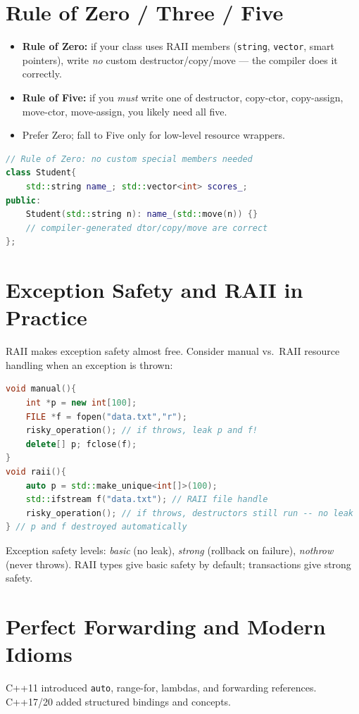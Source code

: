\section{Rule of Zero / Three / Five}
\label{sec:rule-of-five}
\begin{itemize}[leftmargin=*]
    \item \textbf{Rule of Zero:} if your class uses RAII members (\texttt{string}, \texttt{vector}, smart pointers), write \emph{no} custom destructor/copy/move --- the compiler does it correctly.
    \item \textbf{Rule of Five:} if you \emph{must} write one of destructor, copy-ctor, copy-assign, move-ctor, move-assign, you likely need all five.
    \item Prefer Zero; fall to Five only for low-level resource wrappers.
\end{itemize}
\begin{lstlisting}[language=C++]
// Rule of Zero: no custom special members needed
class Student{
    std::string name_; std::vector<int> scores_;
public:
    Student(std::string n): name_(std::move(n)) {}
    // compiler-generated dtor/copy/move are correct
};
\end{lstlisting}


\section{Exception Safety and RAII in Practice}
RAII makes exception safety almost free. Consider manual vs.\ RAII resource handling when an exception is thrown:

\begin{lstlisting}[language=C++]
void manual(){
    int *p = new int[100];
    FILE *f = fopen("data.txt","r");
    risky_operation(); // if throws, leak p and f!
    delete[] p; fclose(f);
}
void raii(){
    auto p = std::make_unique<int[]>(100);
    std::ifstream f("data.txt"); // RAII file handle
    risky_operation(); // if throws, destructors still run -- no leak
} // p and f destroyed automatically
\end{lstlisting}
Exception safety levels: \emph{basic} (no leak), \emph{strong} (rollback on failure), \emph{nothrow} (never throws). RAII types give basic safety by default; transactions give strong safety.

\section{Perfect Forwarding and Modern Idioms}
C++11 introduced \texttt{auto}, range-for, lambdas, and forwarding references. C++17/20 added structured bindings and concepts.


